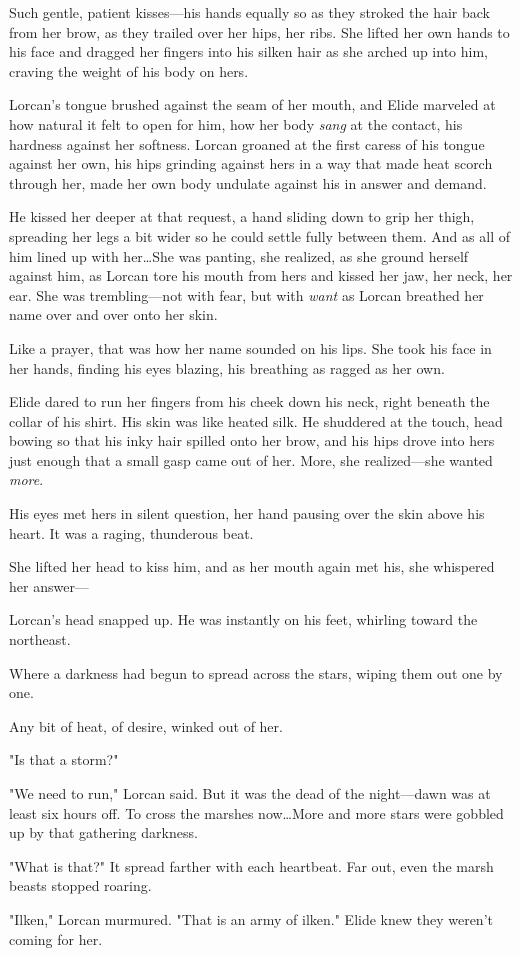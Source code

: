 Such gentle, patient kisses---his hands equally so as they stroked the hair back from her brow, as they trailed over her hips, her ribs.
She lifted her own hands to his face and dragged her fingers into his silken hair as she arched up into him, craving the weight of his body on hers.

Lorcan's tongue brushed against the seam of her mouth, and Elide marveled at how natural it felt to open for him, how her body \emph{sang} at the contact, his hardness against her softness.
Lorcan groaned at the first caress of his tongue against her own, his hips grinding against hers in a way that made heat scorch through her, made her own body undulate against his in answer and demand.

He kissed her deeper at that request, a hand sliding down to grip her thigh, spreading her legs a bit wider so he could settle fully between them.
And as all of him lined up with her\ldots She was panting, she realized, as she ground herself against him, as Lorcan tore his mouth from hers and kissed her jaw, her neck, her ear.
She was trembling---not with fear, but with \emph{want} as Lorcan breathed her name over and over onto her skin.

Like a prayer, that was how her name sounded on his lips.
She took his face in her hands, finding his eyes blazing, his breathing as ragged as her own.

Elide dared to run her fingers from his cheek down his neck, right beneath the collar of his shirt.
His skin was like heated silk.
He shuddered at the touch, head bowing so that his inky hair spilled onto her brow, and his hips drove into hers just enough that a small gasp came out of her.
More, she realized---she wanted \emph{more}.

His eyes met hers in silent question, her hand pausing over the skin above his heart.
It was a raging, thunderous beat.

She lifted her head to kiss him, and as her mouth again met his, she whispered her answer---

Lorcan's head snapped up.
He was instantly on his feet, whirling toward the northeast.

Where a darkness had begun to spread across the stars, wiping them out one by one.

Any bit of heat, of desire, winked out of her.

"Is that a storm?"

"We need to run," Lorcan said.
But it was the dead of the night---dawn was at least six hours off.
To cross the marshes now\ldots More and more stars were gobbled up by that gathering darkness.

"What is that?"
It spread farther with each heartbeat.
Far out, even the marsh beasts stopped roaring.

"Ilken," Lorcan murmured.
"That is an army of ilken."
Elide knew they weren't coming for her.
